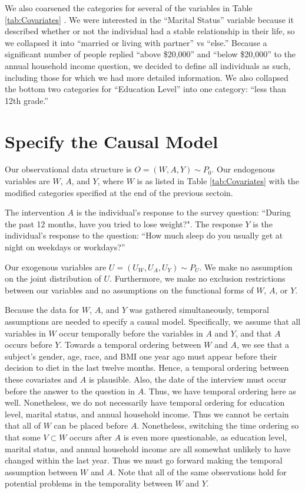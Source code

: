 \documentclass{article}
\begin{document}
We also coarsened the categories for several of the variables in Table \ref{tab:Covariates} .  We were interested in the ``Marital Status'' variable because it described whether or not the individual had a stable relationship in their life, so we collapsed it into ``married or living with partner'' vs ``else.''  Because a significant number of people replied ``above \$20,000'' and ``below \$20,000'' to the annual household income question, we decided to define all individuals as such, including those for which we had more detailed information.  We also collapsed the bottom two categories for ``Education Level'' into one category: ``less than 12th grade.''

\section{Specify the Causal Model}

Our observational data structure is $O=(W,A,Y) \sim P_0$. Our endogenous variables are $W$, $A$, and $Y$, where $W$ is as listed in Table \ref{tab:Covariates}  with the modified categories specified at the end of the previous sectoin.

The intervention $A$ is the individual's response to the survey question: ``During the past 12 months, have you tried to lose weight?". The response $Y$ is the individual's response to the question: ``How much sleep do you usually get at night on weekdays or workdays?''  

Our exogenous variables are $U = (U_W, U_A, U_Y) \sim P_U$. We make no assumption on the joint distribution of $U$. Furthermore, we make no exclusion restrictions between our variables and no assumptions on the functional forms of $W$, $A$, or $Y$.

Because the data for $W$, $A$, and $Y$ was gathered simultaneously, temporal assumptions are needed to specify a causal model. Specifically, we assume that all variables in $W$ occur temporally before the variables in $A$ and $Y$, and that $A$ occurs before $Y$. Towards a temporal ordering between $W$ and $A$, we see that a subject's gender, age, race, and BMI one year ago must appear before their decision to diet in the last twelve months. Hence, a temporal ordering between these covariates and $A$ is plausible. Also, the date of the interview must occur before the answer to the question in $A$. Thus, we have temporal ordering here as well. Nonetheless, we do not necessarily have temporal ordering for education level, marital status, and annual household income. Thus we cannot be certain that all of $W$ can be placed before $A$. Nonetheless, switching the time ordering so that some $V\subset W$ occurs after $A$ is even more questionable, as education level, marital status, and annual household income are all somewhat unlikely to have changed within the last year. Thus we must go forward making the temporal assumption between $W$ and $A$. Note that all of the same observations hold for potential problems in the temporality between $W$ and $Y$.
\end{document}
